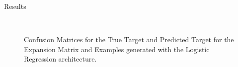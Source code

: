 \documentclass{beamer}
\begin{document}
	\begin{frame}{Results}
		\begin{figure}[h!]
			\centering
			\caption{\enspace Confusion Matrices for the True Target and Predicted Target for the Expansion Matrix and Examples generated with the Logistic Regression architecture.}
			   \\
		\end{figure}
	\end{frame}
	
\end{document}
